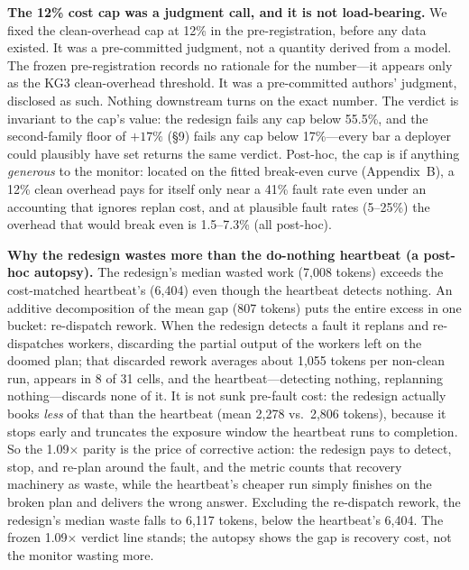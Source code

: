 \documentclass[acmsmall,screen]{acmart}
\begin{document}
\textbf{The 12\% cost cap was a judgment call, and it is not load-bearing.} We fixed
the clean-overhead cap at 12\% in the pre-registration, before any data existed. It was
a pre-committed judgment, not a quantity derived from a model.
The frozen pre-registration records no rationale for the number---it appears only
as the KG3 clean-overhead threshold. It was a pre-committed authors' judgment,
disclosed as such. Nothing
downstream turns on the exact number. The verdict is invariant to the cap's value: the
redesign fails any cap below 55.5\%, and the second-family floor of $+17\%$ (\S9) fails
any cap below 17\%---every bar a deployer could plausibly have set returns the same
verdict. Post-hoc, the cap is if anything \emph{generous} to the monitor: located on the
fitted break-even curve (Appendix~B), a 12\% clean overhead pays for itself only near a
41\% fault rate even under an accounting that ignores replan cost, and at plausible fault
rates (5--25\%) the overhead that would break even is 1.5--7.3\% (all post-hoc).

\textbf{Why the redesign wastes more than the do-nothing heartbeat (a post-hoc autopsy).}
The redesign's median wasted work (7,008 tokens) exceeds the cost-matched heartbeat's
(6,404) even though the heartbeat detects nothing. An additive decomposition of the mean
gap (807 tokens) puts the entire excess in one bucket: re-dispatch rework. When the
redesign detects a fault it replans and re-dispatches workers, discarding the partial
output of the workers left on the doomed plan; that discarded rework averages about 1,055
tokens per non-clean run, appears in 8 of 31 cells, and the heartbeat---detecting nothing,
replanning nothing---discards none of it. It is not sunk pre-fault cost: the redesign
actually books \emph{less} of that than the heartbeat (mean 2,278 vs.\ 2,806 tokens),
because it stops early and truncates the exposure window the heartbeat runs to completion.
So the 1.09$\times$ parity is the price of corrective action: the redesign pays to detect,
stop, and re-plan around the fault, and the metric counts that recovery machinery as waste,
while the heartbeat's cheaper run simply finishes on the broken plan and delivers the wrong
answer. Excluding the re-dispatch rework, the redesign's median waste falls to 6,117 tokens,
below the heartbeat's 6,404. The frozen 1.09$\times$ verdict line stands; the autopsy shows
the gap is recovery cost, not the monitor wasting more.
\end{document}
